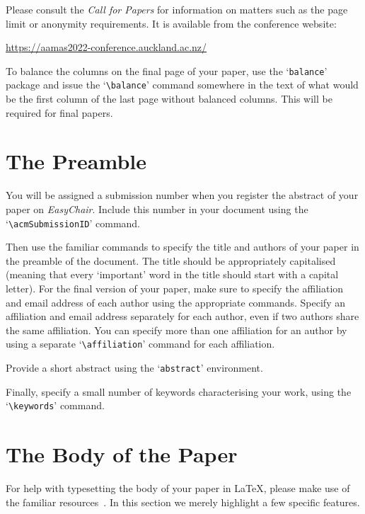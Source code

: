 \documentclass[sigconf]{aamas}
\begin{document}
Please consult the \emph{Call for Papers} for information on matters 
such as the page limit or anonymity requirements. It is available from
the conference website:
%
\begin{center}
\url{https://aamas2022-conference.auckland.ac.nz/}   
\end{center}
%
To balance the columns on the final page of your paper, use the 
`\texttt{balance}' package and issue the `\verb|\balance|' command
 somewhere in the text of what would be the first column of the last 
 page without balanced columns. This will be required for final papers.


\section{The Preamble}

You will be assigned a submission number when you register the abstract 
of your paper on \textit{EasyChair}. Include this number in your 
document using the `\verb|\acmSubmissionID|' command.

Then use the familiar commands to specify the title and authors of your
paper in the preamble of the document. The title should be appropriately 
capitalised (meaning that every `important' word in the title should 
start with a capital letter). For the final version of your paper, make 
sure to specify the affiliation and email address of each author using 
the appropriate commands. Specify an affiliation and email address 
separately for each author, even if two authors share the same 
affiliation. You can specify more than one affiliation for an author by 
using a separate `\verb|\affiliation|' command for each affiliation.

Provide a short abstract using the `\texttt{abstract}' environment.
 
Finally, specify a small number of keywords characterising your work, 
using the `\verb|\keywords|' command. 


\section{The Body of the Paper}

For help with typesetting the body of your paper in \LaTeX\@, please 
make use of the familiar resources~\cite{Lam94}. In this section we 
merely highlight a few specific features. 
\end{document}
